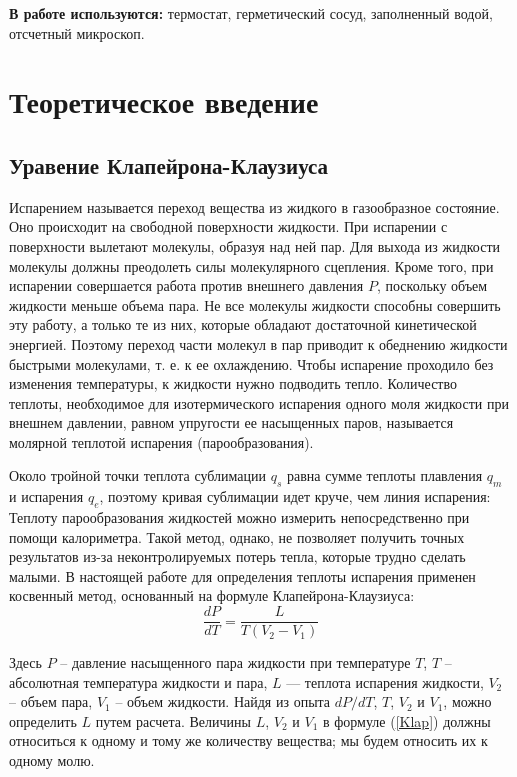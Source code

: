 \documentclass[a4paper,12pt]{article} %
\begin{document}
	\textbf{В работе используются:} термостат, герметический сосуд, заполненный водой, отсчетный микроскоп.
	
\section{Теоретическое введение}
\subsection*{Уравение Клапейрона-Клаузиуса}

Испарением называется переход вещества из жидкого в газообразное состояние. Оно происходит на свободной поверхности жидкости. При испарении с поверхности вылетают молекулы, образуя над ней пар. Для выхода из жидкости молекулы должны преодолеть силы молекулярного сцепления. Кроме того, при испарении совершается работа против внешнего давления $P$, поскольку объем жидкости меньше объема пара. Не все молекулы жидкости способны совершить эту работу, а только те из них, которые обладают достаточной кинетической энергией. Поэтому переход части молекул в пар приводит к обеднению жидкости быстрыми молекулами, т. е. к ее охлаждению. Чтобы испарение проходило без изменения температуры, к жидкости нужно подводить тепло. Количество теплоты, необходимое для изотермического испарения одного моля жидкости при внешнем давлении, равном упругости ее насыщенных паров, называется молярной теплотой испарения (парообразования).
    
Около тройной точки теплота сублимации $q_s$ равна сумме теплоты плавления $q_m$ и испарения $q_e$, поэтому кривая сублимации идет круче, чем линия испарения:
Теплоту парообразования жидкостей можно измерить непосредственно при помощи калориметра. Такой метод, однако, не позволяет получить точных результатов из-за неконтролируемых потерь тепла, которые трудно сделать малыми. В настоящей работе для определения теплоты испарения применен косвенный метод, основанный на формуле Клапейрона-Клаузиуса:
\begin{equation}
    \label{Klap}
    \frac{dP}{dT} = \frac{L}{T(V_2 - V_1)}
\end{equation}
\break

Здесь $P$ -- давление насыщенного пара жидкости при температуре $T$, $T$ -- абсолютная температура жидкости и пара, $L$ — теплота испарения жидкости, $V_2$ -- объем пара, $V_1$ -- объем жидкости. Найдя из опыта $dP/dT$, $T$, $V_2$ и $V_1$, можно определить $L$ путем расчета. Величины $L$, $V_2$ и $V_1$ в формуле (\ref{Klap}) должны относиться к одному и тому же количеству вещества; мы будем относить их к одному молю.
\end{document}
